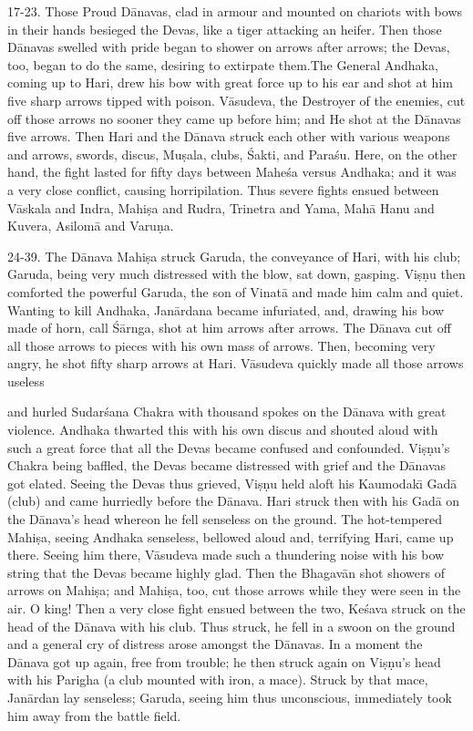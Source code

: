 17-23. Those Proud D\=anavas, clad in armour and mounted on chariots with bows in their hands besieged the Devas, like a tiger attacking an heifer. Then those D\=anavas swelled with pride began to shower on arrows after arrows; the Devas, too, began to do the same, desiring to extirpate them.The General Andhaka, coming up to Hari, drew his bow with great force up to his ear and shot at him five sharp arrows tipped with poison. V\=asudeva, the Destroyer of the enemies, cut off those arrows no sooner they came up before him; and He shot at the D\=anavas five arrows. Then Hari and the D\=anava struck each other with various weapons and arrows, swords, discus, Mu\d{s}ala, clubs, \'Sakti, and Para\'su. Here, on the other hand, the fight lasted for fifty days between Mahe\'sa versus Andhaka; and it was a very close conflict, causing horripilation. Thus severe fights ensued between V\=askala and Indra, Mahi\d{s}a and Rudra, Trinetra and Yama, Mah\=a Hanu and Kuvera, Asilom\=a and Varu\d{n}a.

24-39. The D\=anava Mahi\d{s}a struck Garuda, the conveyance of Hari, with his club; Garuda, being very much distressed with the blow, sat down, gasping. Vi\d{s}\d{n}u then comforted the powerful Garuda, the son of Vinat\=a and made him calm and quiet. Wanting to kill Andhaka, Jan\=ardana became infuriated, and, drawing his bow made of horn, call \'S\=arnga, shot at him arrows after arrows. The D\=anava cut off all those arrows to pieces with his own mass of arrows. Then, becoming very angry, he shot fifty sharp arrows at Hari. V\=asudeva quickly made all those arrows useless

and hurled Sudar\'sana Chakra with thousand spokes on the D\=anava with great violence. Andhaka thwarted this with his own discus and shouted aloud with such a great force that all the Devas became confused and confounded. Vi\d{s}\d{n}u's Chakra being baffled, the Devas became distressed with grief and the D\=anavas got elated. Seeing the Devas thus grieved, Vi\d{s}\d{n}u held aloft his Kaumodak\={\i} Gad\=a (club) and came hurriedly before the D\=anava. Hari struck then with his Gad\=a on the D\=anava's head whereon he fell senseless on the ground. The hot-tempered Mahi\d{s}a, seeing Andhaka senseless, bellowed aloud and, terrifying Hari, came up there. Seeing him there, V\=asudeva made such a thundering noise with his bow string that the Devas became highly glad. Then the Bhagav\=an shot showers of arrows on Mahi\d{s}a; and Mahi\d{s}a, too, cut those arrows while they were seen in the air. O king! Then a very close fight ensued between the two, Ke\'sava struck on the head of the D\=anava with his club. Thus struck, he fell in a swoon on the ground and a general cry of distress arose amongst the D\=anavas. In a moment the D\=anava got up again, free from trouble; he then struck again on Vi\d{s}\d{n}u's head with his Parigha (a club mounted with iron, a mace). Struck by that mace, Jan\=ardan lay senseless; Garuda, seeing him thus unconscious, immediately took him away from the battle field.

